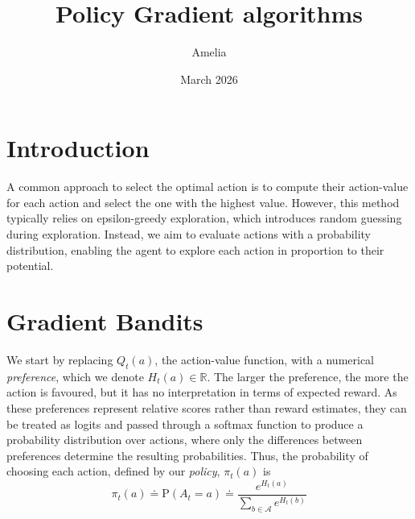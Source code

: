 \documentclass{article}
\title{Policy Gradient algorithms}
\author{Amelia}
\date{March 2026}
\begin{document}
\maketitle

\section{Introduction}
A common approach to select the optimal action is to compute their action-value for each action and select the one with the highest value. However, this method typically relies on epsilon-greedy exploration, which introduces random guessing during exploration. Instead, we aim to evaluate actions with a probability distribution, enabling the agent to explore each action in proportion to their potential.
\section{Gradient Bandits}
We start by replacing $Q_t(a)$, the action-value function, with a numerical \textit{preference}, which we denote $H_t(a) \in \mathbb R$. The larger the preference, the more the action is favoured, but it has no interpretation in terms of expected reward. As these preferences represent relative scores rather than reward estimates, they can be treated as logits and passed through a softmax function to produce a probability distribution over actions, where only the differences between preferences determine the resulting probabilities. Thus, the probability of choosing each action, defined by our \textit{policy}, $\pi_t(a)$ is
\begin{equation}
    \pi_t(a) \doteq \mathrm {P}(A_t = a) \doteq \frac{e^{H_t(a)}}{\sum_{b \in \mathcal A}e^{H_t(b)}}
\end{equation}
\end{document}
